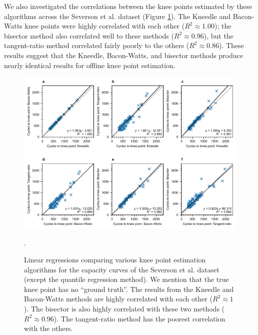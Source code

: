 \documentclass[journal=jpclcd,manuscript=article]{achemso}
\begin{document}
We also investigated the correlations between the knee points estimated by these algorithms across the Severson et al.\cite{severson_data-driven_2019} dataset (Figure \ref{fig:severson_knee_compare_all_algorithms}).
The Kneedle and Bacon-Watts knee points were highly correlated with each other ($R^2\approx 1.00$); the bisector method also correlated well to these methods ($R^2\approx 0.96$), but the tangent-ratio method correlated fairly poorly to the others ($R^2\approx 0.86$).
These results suggest that the Kneedle, Bacon-Watts, and bisector methods produce nearly identical results for offline knee point estimation.

\newpage
\begin{figure}[hb]
\centering
\includegraphics[scale=1.0]{final_figures/severson_knee_compare_all_algorithms.pdf}
\caption{
Linear regressions comparing various knee point estimation algorithms for the capacity curves of the Severson et al. \cite{severson_data-driven_2019} dataset (except the quantile regression method\cite{zhang_identifying_2020}). We mention that the true knee point has no ``ground truth''.
The results from the Kneedle\cite{satopaa_finding_2011} and Bacon-Watts\cite{fermin-cueto_identification_2020} methods are highly correlated with each other ($R^2\approx 1$). The bisector\cite{greenbank_automated_2021} is also highly correlated with these two methods ($R^2\approx 0.96$). The tangent-ratio method \cite{diao_algorithm_2019} has the poorest correlation with the others.
}.
\label{fig:severson_knee_compare_all_algorithms}
\end{figure}
\end{document}
